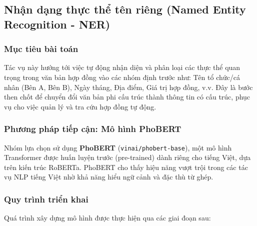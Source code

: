 \subsection{Nhận dạng thực thể tên riêng (Named Entity Recognition - NER)}

\subsubsection{Mục tiêu bài toán}
Tác vụ này hướng tới việc tự động nhận diện và phân loại các thực thể quan trọng trong văn bản hợp đồng vào các nhóm định trước như: Tên tổ chức/cá nhân (Bên A, Bên B), Ngày tháng, Địa điểm, Giá trị hợp đồng, v.v. Đây là bước then chốt để chuyển đổi văn bản phi cấu trúc thành thông tin có cấu trúc, phục vụ cho việc quản lý và tra cứu hợp đồng tự động.

\subsubsection{Phương pháp tiếp cận: Mô hình PhoBERT}
Nhóm lựa chọn sử dụng \textbf{PhoBERT} (\texttt{vinai/phobert-base}), một mô hình Transformer được huấn luyện trước (pre-trained) dành riêng cho tiếng Việt, dựa trên kiến trúc RoBERTa. PhoBERT cho thấy hiệu năng vượt trội trong các tác vụ NLP tiếng Việt nhờ khả năng hiểu ngữ cảnh và đặc thù từ ghép.

\subsubsection{Quy trình triển khai}
Quá trình xây dựng mô hình được thực hiện qua các giai đoạn sau:

